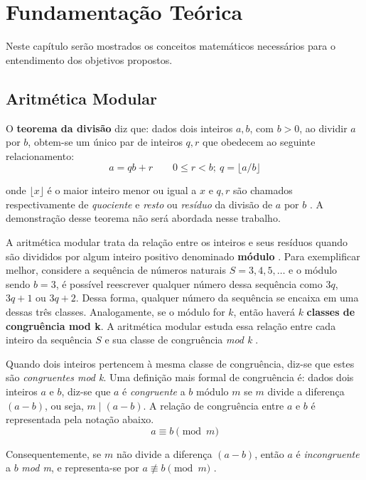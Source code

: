 \chapter{Fundamentação Teórica}
Neste capítulo serão mostrados os conceitos matemáticos necessários para o entendimento dos objetivos propostos.

%
%
\section{Aritmética Modular}

O \textbf{teorema da divisão} diz que: dados dois inteiros $a, b$, com $b > 0$, ao dividir \(a\) por \(b\), obtem-se um único par de inteiros $q, r$ que obedecem ao seguinte relacionamento:
\begin{equation}
  a=qb+r \qquad 0 \leq r<b;\ q=\lfloor a/b \rfloor
\end{equation}

onde $\lfloor x \rfloor$ é o maior inteiro menor ou igual a \(x\) e $q,r$ são chamados respectivamente de \textit{quociente} e \textit{resto} ou \textit{resíduo} da divisão de $a$ por $b$ \cite{Santos:2014}. A demonstração desse teorema não será abordada nesse trabalho.

A aritmética modular trata da relação entre os inteiros e seus resíduos quando são divididos por algum inteiro positivo denominado \textbf{módulo} \cite{Lewinter:2015}. Para exemplificar melhor, considere a sequência de números naturais $S = 3, 4, 5, \dots$ e o módulo sendo $b = 3$, é possível reescrever qualquer número dessa sequência como $3q$, $3q + 1$ ou $3q + 2$. Dessa forma, qualquer número da sequência se encaixa em uma dessas três classes. Analogamente, se o módulo for $k$, então haverá $k$ \textbf{classes de congruência mod k}. A aritmética modular estuda essa relação entre cada inteiro da sequência $S$ e sua classe de congruência \textit{mod k} \cite{Lewinter:2015}.

Quando dois inteiros pertencem à mesma classe de congruência, diz-se que estes são \textit{congruentes mod k}. Uma definição mais formal de congruência é: dados dois inteiros $a$ e $b$, diz-se que $a$ é \textit{congruente} a $b$ módulo $m$ se $m$ divide a diferença $(a-b)$, ou seja, $m \mid (a-b)$. A relação de congruência entre $a$ e $b$ é representada pela notação abaixo.
\begin{equation}
  a \equiv b \pmod m \label{eq:1}
\end{equation}

Consequentemente, se $m$ não divide a diferença $(a - b)$, então $a$ é \textit{incongruente} a $b$ \textit{mod m}, e representa-se por $a \not\equiv b \pmod m$ \cite{Santos:2014}.


